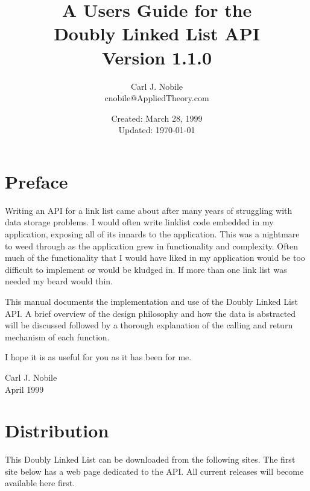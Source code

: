 \documentclass[10pt,letterpaper,titlepage]{article}
\begin{document}
\title{A Users Guide for the\\
       Doubly Linked List API\\
       Version 1.1.0}
\author{Carl J. Nobile\\
	cnobile@AppliedTheory.com}
\date{Created: March 28, 1999\\
	Updated: \today}
\maketitle

\section{Preface}
Writing an API for a link list came about after many years of struggling with data storage problems.  I would often write link\-list code embedded in my application, exposing all of its innards to the application.  This was a nightmare to weed through as the application grew in functionality and complexity.  Often much of the functionality that I would have liked in my application would be too difficult to implement or would be kludged in.  If more than one link list was needed my beard would thin.
\vspace{8pt}

\noindent
This manual documents the implementation and use of the Doubly Linked List API.  A brief overview of the design philosophy and how the data is abstracted will be discussed followed by a thorough explanation of the calling and return mechanism of each function.
\vspace{8pt}

\noindent
I hope it is as useful for you as it has been for me.
\vspace{8pt}
\begin{flushright}
Carl J. Nobile\\
April 1999
\end{flushright}
\pagebreak

\tableofcontents
\pagebreak

\section{Distribution}
This Doubly Linked List can be downloaded from the following sites.  The first site below has a web page dedicated to the API.  All current releases will become available here first.
\vspace{8pt}
\end{document}
